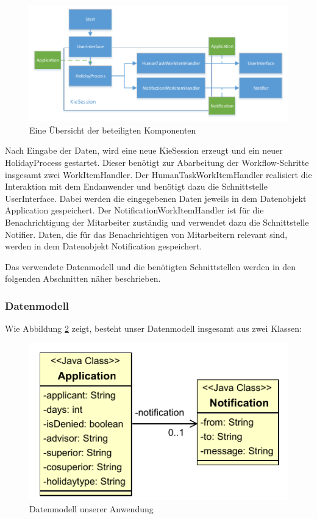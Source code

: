 \begin{figure}[H]
\centering
\includegraphics[width=0.93\linewidth]{Bilder/Komponenten}
\caption{Eine Übersicht der beteiligten Komponenten}
\label{fig:Komponenten}
\end{figure}

Nach Eingabe der Daten, wird eine neue KieSession erzeugt und ein neuer HolidayProcess gestartet. Dieser benötigt zur Abarbeitung der Workflow-Schritte insgesamt zwei WorkItemHandler. Der HumanTaskWorkItemHandler realisiert die Interaktion mit dem Endanwender und benötigt dazu die Schnittstelle UserInterface. Dabei werden die eingegebenen Daten jeweils in dem Datenobjekt Application gespeichert. Der NotificationWorkItemHandler ist für die Benachrichtigung der Mitarbeiter zuständig und verwendet dazu die Schnittstelle Notifier. Daten, die für das Benachrichtigen von Mitarbeitern relevant sind, werden in dem Datenobjekt Notification gespeichert.

Das verwendete Datenmodell und die benötigten Schnittstellen werden in den folgenden Abschnitten näher beschrieben.
\newpage
\subsubsection{Datenmodell}
Wie Abbildung \ref{fig:Datenmodell} zeigt, besteht unser Datenmodell insgesamt aus zwei Klassen:

\begin{figure}[H]
\centering
\includegraphics[width=0.5\linewidth]{Bilder/Datenmodell}
\caption{Datenmodell unserer Anwendung}
\label{fig:Datenmodell}
\end{figure}

